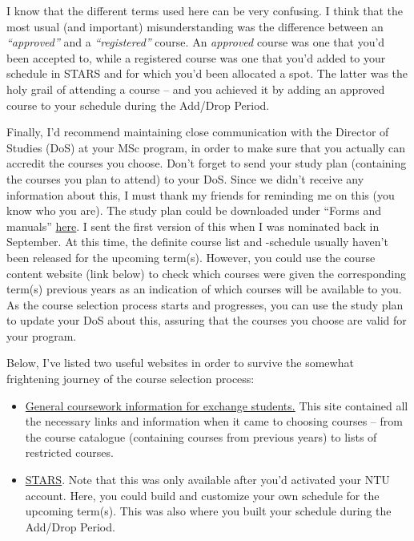 I know that the different terms used here can be very confusing. I think that the most usual (and important) misunderstanding was the difference between an \textit{``approved''} and a \textit{``registered''} course. An \textit{approved} course was one that you'd been accepted to, while a registered course was one that you'd added to your schedule in STARS and for which you'd been allocated a spot. The latter was the holy grail of attending a course -- and you achieved it by adding an approved course to your schedule during the Add/Drop Period.

Finally, I'd recommend maintaining close communication with the Director of Studies (DoS) at your MSc program, in order to make sure that you actually can accredit the courses you choose. Don't forget to send your study plan (containing the courses you plan to attend) to your DoS. Since we didn't receive any information about this, I must thank my friends for reminding me on this (you know who you are). The study plan could be downloaded under ``Forms and manuals'' \href{https://www.chalmers.se/en/education/your-studies/exchange-studies-and-international-opportunities/exchange-studies/preparing-for-exchange-studies/}{here}. I sent the first version of this when I was nominated back in September. At this time, the definite course list and -schedule usually haven't been released for the upcoming term(s). However, you could use the course content website (link below) to check which courses were given the corresponding term(s) previous years as an indication of which courses will be available to you. As the course selection process starts and progresses, you can use the study plan to update your DoS about this, assuring that the courses you choose are valid for your program.

\vspace{-0.3cm}
\hrulefill

Below, I've listed two useful websites in order to survive the somewhat frightening journey of the course selection process:
\begin{itemize}
    \item \href{https://gem.ntu.edu.sg/index.cfm?FuseAction=Programs.ViewProgramAngular&id=10006}{General coursework information for exchange students.} This site contained all the necessary links and information when it came to choosing courses -- from the course catalogue (containing courses from previous years) to lists of restricted courses.
    \item \href{https://wish.wis.ntu.edu.sg/pls/webexe/ldap_login.login?w_url=https://wish.wis.ntu.edu.sg/pls/webexe/aus_stars_planner.main}{STARS}. Note that this was only available after you'd activated your NTU account. Here, you could build and customize your own schedule for the upcoming term(s). This was also where you built your schedule during the Add/Drop Period.
\end{itemize}
\vspace{-0.35cm}
